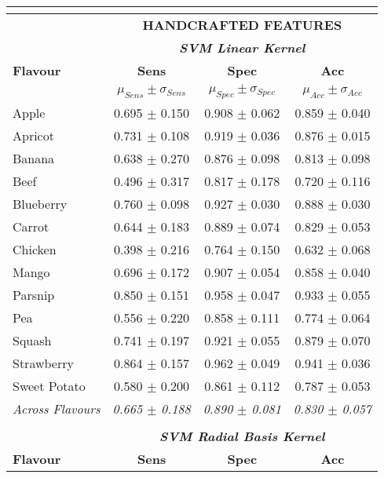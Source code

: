 \documentclass[authoryear]{elsarticle}
\begin{document}
    \begin{tabular}{lccc}
    \multicolumn{4}{c}{}\\  
    \toprule
    	& \multicolumn{3}{c}{\textbf{HANDCRAFTED FEATURES}} \\
        & \multicolumn{3}{c}{\textit{\textbf{SVM Linear Kernel}}}\\
    \midrule
    \textbf{Flavour} & \textbf{Sens} & \textbf{Spec} & \textbf{Acc}\\
    & $\mu_{Sens} \pm \sigma_{Sens}$ & $\mu_{Spec} \pm \sigma_{Spec}$ & $\mu_{Acc} \pm \sigma_{Acc}$ \\
    \midrule
    Apple 		 & 0.695 $\pm$ 0.150 & 0.908 $\pm$ 0.062 & 0.859 $\pm$ 0.040 \\
    Apricot 	 & 0.731 $\pm$ 0.108 & 0.919 $\pm$ 0.036 & 0.876 $\pm$ 0.015 \\
    Banana 		 & 0.638 $\pm$ 0.270 & 0.876 $\pm$ 0.098 & 0.813 $\pm$ 0.098 \\
    Beef 		 & 0.496 $\pm$ 0.317 & 0.817 $\pm$ 0.178 & 0.720 $\pm$ 0.116 \\
    Blueberry 	 & 0.760 $\pm$ 0.098 & 0.927 $\pm$ 0.030 & 0.888 $\pm$ 0.030 \\
    Carrot 		 & 0.644 $\pm$ 0.183 & 0.889 $\pm$ 0.074 & 0.829 $\pm$ 0.053 \\
    Chicken 	 & 0.398 $\pm$ 0.216 & 0.764 $\pm$ 0.150 & 0.632 $\pm$ 0.068 \\
    Mango 		 & 0.696 $\pm$ 0.172 & 0.907 $\pm$ 0.054 & 0.858 $\pm$ 0.040 \\
    Parsnip 	 & 0.850 $\pm$ 0.151 & 0.958 $\pm$ 0.047 & 0.933 $\pm$ 0.055 \\
    Pea 		 & 0.556 $\pm$ 0.220 & 0.858 $\pm$ 0.111 & 0.774 $\pm$ 0.064 \\
    Squash 		 & 0.741 $\pm$ 0.197 & 0.921 $\pm$ 0.055 & 0.879 $\pm$ 0.070 \\
    Strawberry 	 & 0.864 $\pm$ 0.157 & 0.962 $\pm$ 0.049 & 0.941 $\pm$ 0.036 \\
    Sweet Potato & 0.580 $\pm$ 0.200 & 0.861 $\pm$ 0.112 & 0.787 $\pm$ 0.053 \\
    \midrule
    \textit{Across Flavours} & \textit{0.665 $\pm$ 0.188} & \textit{0.890 $\pm$ 0.081} & \textit{0.830 $\pm$ 0.057} \\
    \midrule
    \multicolumn{4}{c}{}\\
    \midrule
        & \multicolumn{3}{c}{\textit{\textbf{SVM Radial Basis Kernel}}}\\
    \midrule
    \textbf{Flavour} & \textbf{Sens} & \textbf{Spec} & \textbf{Acc}\\

\end{tabular}
\end{document}
